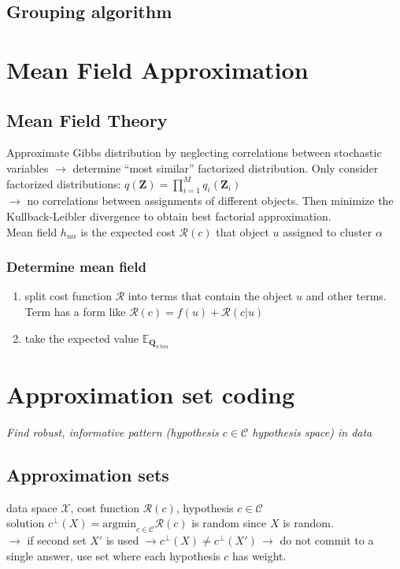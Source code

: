 \documentclass[9pt,parskip]{scrartcl}
\begin{document}
\begin{multicols*}{4}
\subsection*{Grouping algorithm}

\section*{Mean Field Approximation}
\subsection*{Mean Field Theory}
Approximate Gibbs distribution by neglecting correlations between stochastic variables $\to$ determine "`most similar"' factorized distribution.
Only consider factorized distributions: 
$q(\mathbf{Z}) = \prod_{i=1}^{M} q_i(\mathbf{Z}_i)$ \\
$\to$ no correlations between assignments of different objects.
Then minimize the Kullback-Leibler divergence to obtain best factorial approximation. \\
Mean field $h_{u \alpha}$ is the expected cost $\mathcal{R}(c)$ that object $u$ assigned to cluster $\alpha$ 

\subsubsection*{Determine mean field}
\begin{enumerate}
	\item split cost function $\mathcal{R}$ into terms that contain the object $u$ and other terms. Term has a form like $\mathcal{R}(c) = f(u) + \mathcal{R}(c|u)$
	\item take the expected value $\mathbb{E}_{\mathbf{Q}_{u \ to \alpha}}$
\end{enumerate}
\section*{Approximation set coding}
\textit{Find robust, informative pattern (hypothesis $c\in \mathcal{C}$ hypothesis space) in data }
\subsection*{Approximation sets}
data space $\mathcal{X}$, cost function $\mathcal{R}(c)$, hypothesis $c\in \mathcal{C}$ \\
solution $c^{\bot}(X) = \text{argmin}_{c \in \mathcal{C}} \mathcal{R}(c)$ is random since $X$ is random. \\
$\to$ if second set $X'$ is used $\to c^{\bot}(X) \neq c^{\bot}(X') \, \to$ do not commit to a single answer, use set where each hypothesis $c$ has weight. \\

\end{multicols*}
\end{document}
